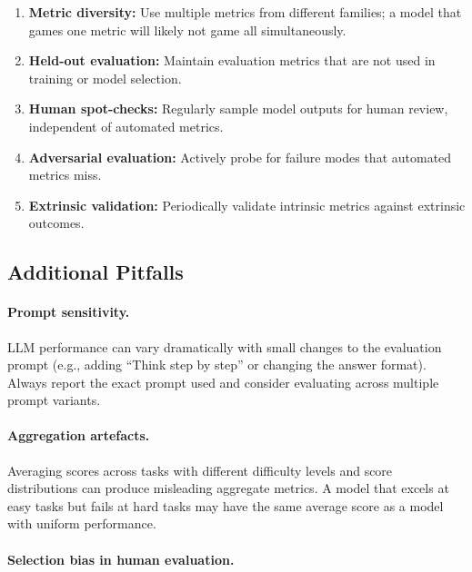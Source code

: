 \begin{keybox}
\begin{enumerate}
  \item \textbf{Metric diversity:} Use multiple metrics from different families; a model that games one metric will likely not game all simultaneously.
  \item \textbf{Held-out evaluation:} Maintain evaluation metrics that are not used in training or model selection.
  \item \textbf{Human spot-checks:} Regularly sample model outputs for human review, independent of automated metrics.
  \item \textbf{Adversarial evaluation:} Actively probe for failure modes that automated metrics miss.
  \item \textbf{Extrinsic validation:} Periodically validate intrinsic metrics against extrinsic outcomes.
\end{enumerate}
\end{keybox}

\subsection{Additional Pitfalls}
\label{additional-pitfalls}

\paragraph{Prompt sensitivity.}
\label{prompt-sensitivity.}

LLM performance can vary dramatically with small changes to the evaluation prompt (e.g., adding ``Think step by step'' or changing the answer format). Always report the exact prompt used and consider evaluating across multiple prompt variants.

\paragraph{Aggregation artefacts.}
\label{aggregation-artefacts.}

Averaging scores across tasks with different difficulty levels and score distributions can produce misleading aggregate metrics. A model that excels at easy tasks but fails at hard tasks may have the same average score as a model with uniform performance.

\paragraph{Selection bias in human evaluation.}
\label{selection-bias-in-human-evaluation.}

